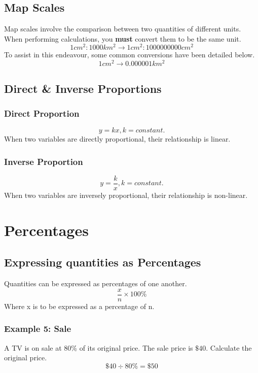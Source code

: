 \documentclass{report}
\begin{document}
\begin{flushleft}
\subsection{Map Scales}
Map scales involve the comparison between two quantities of different units. When performing calculations, you \textbf{must} convert them to be the same unit.
\begin{equation}
    1cm^2:1000km^2 \rightarrow 1cm^2:1000000000cm^2
\end{equation}
To assist in this endeavour, some common conversions have been detailed below.
\[1cm^2\rightarrow0.000001km^2\]

\subsection{Direct \& Inverse Proportions}
\subsubsection*{Direct Proportion}
\begin{equation}
    y=kx, k=constant.
\end{equation}
When two variables are directly proportional, their relationship is linear.

\subsubsection*{Inverse Proportion}
\begin{equation}
    y=\frac{k}{x}, k=constant.
\end{equation}
When two variables are inversely proportional, their relationship is non-linear.

\section{Percentages}
\subsection{Expressing quantities as Percentages}
Quantities can be expressed as percentages of one another.
\begin{equation}
    \frac{x}{n}\times 100\%
\end{equation}
Where x is  to be expressed as a percentage of n.
\par
\subsubsection*{Example 5: Sale}
A TV is on sale at 80\% of its original price. The sale price is $\$40$. Calculate the original price.
\[\$40\div 80\%=\$50\]


\end{flushleft}
\end{document}
